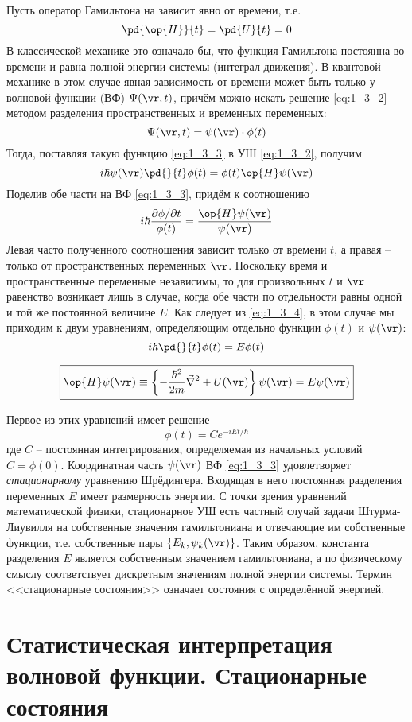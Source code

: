 Пусть оператор Гамильтона на зависит явно от времени, т.е.
$$\pd{\op{H}}{t} = \pd{U}{t} = 0$$
В классической механике это означало бы, что функция Гамильтона постоянна во времени и равна полной энергии системы (интеграл движения). В квантовой механике в этом случае явная зависимость от времени может быть только у волновой функции (ВФ) $\Psi(\vr,t)$, причём можно искать решение \eqref{eq:1_3_2} методом разделения пространственных и временных переменных:%
%
\begin{equation}
\label{eq:1_3_3}
\Psi(\vr,t) = \psi(\vr) \cdot \phi (t)
\end{equation}%
%
Тогда, поставляя такую функцию \eqref{eq:1_3_3} в УШ \eqref{eq:1_3_2}, получим
$$
i \hbar \psi(\vr) \pd{}{t} \phi (t) = \phi (t) \op{H} \psi(\vr)
$$%
%
Поделив обе части на ВФ \eqref{eq:1_3_3}, придём к соотношению
\begin{equation}
\label{eq:1_3_4}
i \hbar \frac{\partial \phi / \partial t}{\phi(t)} = \frac{\op{H} \psi(\vr)}{\psi(\vr)}
\end{equation}
Левая часто полученного соотношения зависит только от времени $t$, а правая -- только от пространственных переменных $\vr$. Поскольку время и пространственные переменные независимы, то для произвольных $t$ и $\vr$ равенство возникает лишь в случае, когда обе части по отдельности равны одной и той же постоянной величине $E$. Как следует из \eqref{eq:1_3_4}, в этом случае мы приходим к двум уравнениям, определяющим отдельно функции $\phi(t)$ и $\psi(\vr)$:
\begin{equation}
\label{eq:1_3_5}
i \hbar \pd{}{t} \phi(t) = E \phi(t)
\end{equation}

\begin{equation}
\label{eq:1_3_6}
\boxed{\op{H} \psi(\vr) \equiv \left\{ -\frac{\hbar^2}{2m} \vec{\nabla}^2 + U(\vr) \right\}\psi(\vr) = E\psi(\vr)}
\end{equation}

Первое из этих уравнений имеет решение
$$
\phi(t)=C e^{-iEt/\hbar}
$$
где $C$ -- постоянная интегрирования, определяемая из начальных условий $C = \phi(0)$. Координатная часть $\psi(\vr)$ ВФ \eqref{eq:1_3_3} удовлетворяет {\em стационарному} уравнению Шрёдингера. Входящая в него постоянная разделения переменных $E$ имеет размерность энергии. С точки зрения уравнений математической физики, стационарное УШ есть частный случай задачи Штурма-Лиувилля\footnotemark{} на собственные значения гамильтониана и отвечающие им собственные функции, т.е. собственные пары $\{E_k, \psi_k(\vr)\}$. Таким образом, константа разделения $E$ является собственным значением гамильтониана, а по физическому смыслу соответствует дискретным значениям полной энергии системы. Термин <<стационарные состояния>> означает состояния с определённой энергией.
%
\begin{sloppypar}
  \section{Статистическая интерпретация волновой функции. Стационарные состояния}
\end{sloppypar}

